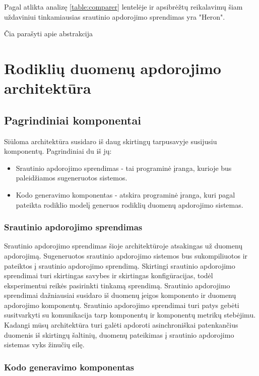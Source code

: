 \documentclass{VUMIFPSbakalaurinis}
\begin{document}
Pagal atlikta analizę \ref{table:comparer} lentelėje ir apsibrėžtų reikalavimų šiam uždaviniui tinkamiausias srautinio apdorojimo sprendimas yra "Heron". \par
Čia parašyti apie abstrakcija \par
 
\section{Rodiklių duomenų apdorojimo architektūra}

\subsection{Pagrindiniai komponentai}
Siūloma architektūra susidaro iš daug skirtingų tarpusavyje susijusiu komponentų. Pagrindiniai du iš jų:
\begin{itemize}
    \item Srautinio apdorojimo sprendimas - tai programinė įranga, kurioje bus paleidžiamos sugeneruotos sistemos.
    \item Kodo generavimo komponentas - atskira programinė įranga, kuri pagal pateikta rodiklio modelį generuos rodiklių duomenų apdorojimo sistemas. 
\end{itemize}

\subsubsection{Srautinio apdorojimo sprendimas}

Srautinio apdorojimo sprendimas šioje architektūroje atsakingas už duomenų apdorojimą. Sugeneruotos srautinio apdorojimo sistemos bus sukompiliuotos ir pateiktos į srautinio apdorojimo sprendimą. Skirtingi srautinio apdorojimo sprendimai turi skirtingas savybes ir skirtingas konfigūracijas, todėl eksperimentui reikės pasirinkti tinkamą sprendimą. Srautinio apdorojimo sprendimai dažniausiai susidaro iš duomenų įeigos komponento ir duomenų apdorojimo komponentų. Srautinio apdorojimo sprendimai turi patys gebėti susitvarkyti su komunikacija tarp komponentų ir komponentų metrikų stebėjimu. Kadangi mūsų architektūra turi galėti apdoroti asinchroniškai patenkančius duomenis iš skirtingų šaltinių, duomenų pateikimas į srautinio apdorojimo sistemas vyks žinučių eilę. 

\subsubsection{Kodo generavimo komponentas}
\end{document}
